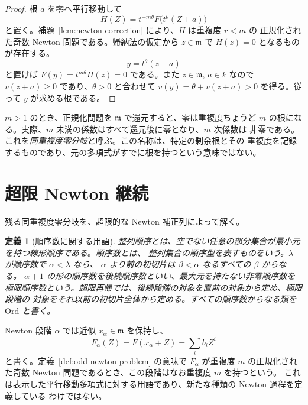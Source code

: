 \documentclass[11pt,uplatex,dvipdfmx]{jsarticle}
\newcommand{\Val}{v}
\newcommand{\namedref}[2]{\hyperref[#2]{#1~\ref*{#2}}}
\theoremstyle{proofnote}
\newtheorem{definition}[theorem]{定義}
\begin{document}
\begin{proof}
  根 \(a\) を零へ平行移動して
  \[
    H(Z)=t^{-m\theta}F\bigl(t^\theta(Z+a)\bigr)
  \]
  と置く。\namedref{補題}{lem:newton-correction} により、\(H\) は重複度 \(r<m\) の
  正規化された奇数 Newton 問題である。帰納法の仮定から
  \(z\in\mathfrak m\) で \(H(z)=0\) となるものが存在する。
  \[
    y=t^\theta(z+a)
  \]
  と置けば \(F(y)=t^{m\theta}H(z)=0\) である。また \(z\in\mathfrak m\), \(a\in k\) なので
  \(\Val(z+a)\ge0\) であり、\(\theta>0\) と合わせて
  \(\Val(y)=\theta+\Val(z+a)>0\) を得る。従って \(y\) が求める根である。
\end{proof}

\(m>1\) のとき、正規化問題を \(\mathfrak m\) で還元すると、零は重複度ちょうど
\(m\) の根になる。実際、\(m\) 未満の係数はすべて還元後に零となり、\(m\) 次係数は
非零である。これを\emph{同重複度零分岐}と呼ぶ。この名称は、特定の剰余根とその
重複度を記録するものであり、元の多項式がすでに根を持つという意味ではない。

\section{超限 Newton 継続}
\label{sec:transfinite}

残る同重複度零分岐を、超限的な Newton 補正列によって解く。

\begin{definition}[順序数に関する用語]
\label{def:ordinal-terminology}
  整列順序とは、空でない任意の部分集合が最小元を持つ線形順序である。順序数とは、
  整列集合の順序型を表すものをいう。\(\lambda\) が順序数で \(\alpha<\lambda\) なら、
  \(\alpha\) より前の初切片は \(\beta<\alpha\) なるすべての \(\beta\) からなる。
  \(\alpha+1\) の形の順序数を後続順序数といい、最大元を持たない非零順序数を
  極限順序数という。超限再帰では、後続段階の対象を直前の対象から定め、極限段階の
  対象をそれ以前の初切片全体から定める。すべての順序数からなる類を
  \(\mathrm{Ord}\) と書く。
\end{definition}

Newton 段階 \(\alpha\) では近似 \(x_\alpha\in\mathfrak m\) を保持し、
\[
  F_\alpha(Z)=F(x_\alpha+Z)=\sum_i b_iZ^i
\]
と書く。\namedref{定義}{def:odd-newton-problem} の意味で \(F_\alpha\) が重複度
\(m\) の正規化された奇数 Newton 問題であるとき、この段階はなお重複度 \(m\) を持つという。
これは表示した平行移動多項式に対する用語であり、新たな種類の Newton 過程を定義している
わけではない。
\end{document}
